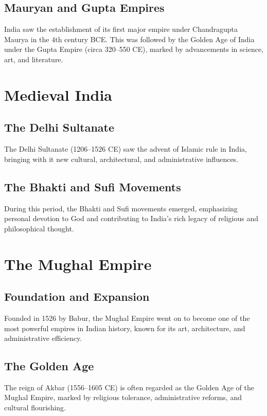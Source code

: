 \documentclass[a4paper,12pt]{book}
\begin{document}
\subsection{Mauryan and Gupta Empires}
India saw the establishment of its first major empire under Chandragupta Maurya in the 4th century BCE. This was followed by the Golden Age of India under the Gupta Empire (circa 320–550 CE), marked by advancements in science, art, and literature.

\section{Medieval India}
\label{sec:medieval-india}

\subsection{The Delhi Sultanate}
The Delhi Sultanate (1206–1526 CE) saw the advent of Islamic rule in India, bringing with it new cultural, architectural, and administrative influences.

\subsection{The Bhakti and Sufi Movements}
During this period, the Bhakti and Sufi movements emerged, emphasizing personal devotion to God and contributing to India’s rich legacy of religious and philosophical thought.

\section{The Mughal Empire}
\label{sec:mughal-empire}

\subsection{Foundation and Expansion}
Founded in 1526 by Babur, the Mughal Empire went on to become one of the most powerful empires in Indian history, known for its art, architecture, and administrative efficiency.

\subsection{The Golden Age}
The reign of Akbar (1556–1605 CE) is often regarded as the Golden Age of the Mughal Empire, marked by religious tolerance, administrative reforms, and cultural flourishing.
\end{document}
